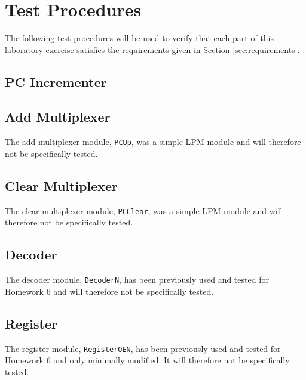 \section{Test Procedures} %
\label{sec:test_procedures}

The following test procedures will be used to verify that each part of this laboratory exercise satisfies the requirements given in \hyperref[sec:requirements]{Section \ref*{sec:requirements}}.

\subsection{PC Incrementer} %
\label{sub:pc_incrementer}


\subsection{Add Multiplexer} %
\label{sub:add_multiplexer}

The add multiplexer module, \verb|PCUp|, was a simple LPM module and will therefore not be specifically tested.

\subsection{Clear Multiplexer} %
\label{sub:clear_multiplexer}

The clear multiplexer module, \verb|PCClear|, was a simple LPM module and will therefore not be specifically tested.

\subsection{Decoder} %
\label{sub:decoder}

The decoder module, \verb|DecoderN|, has been previously used and tested for Homework 6 and will therefore not be specifically tested.

\subsection{Register} %
\label{sub:register}

The register module, \verb|RegisterOEN|, has been previously used and tested for Homework 6  and only minimally modified.
It will therefore not be specifically tested.

